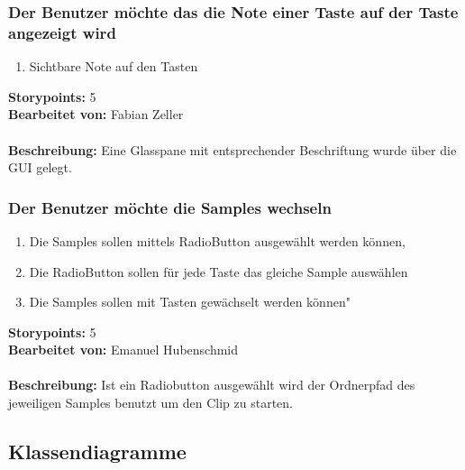 \subsubsection{Der Benutzer möchte das die Note einer Taste auf der Taste angezeigt wird}

\begin{enumerate}
 \item Sichtbare Note auf den Tasten
\end{enumerate}

\textbf{Storypoints:} 5 \\
\textbf{Bearbeitet von:} Fabian Zeller \\
\\
\textbf{Beschreibung:} Eine Glasspane mit entsprechender Beschriftung wurde über die GUI gelegt.


\subsubsection{Der Benutzer möchte die Samples wechseln}

\begin{enumerate}
 \item Die Samples sollen mittels RadioButton ausgewählt werden können,
 \item Die RadioButton sollen für jede Taste das gleiche Sample auswählen
 \item Die Samples sollen mit Tasten gewächselt werden können"
\end{enumerate}

\textbf{Storypoints:} 5 \\
\textbf{Bearbeitet von:} Emanuel Hubenschmid \\
\\
\textbf{Beschreibung:} Ist ein Radiobutton ausgewählt wird der Ordnerpfad 
des jeweiligen Samples benutzt um den Clip zu starten.


\newpage

\subsection{Klassendiagramme}

